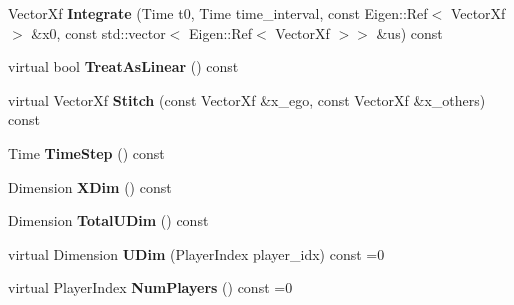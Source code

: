 \begin{DoxyCompactItemize}
\item 
Vector\+Xf {\bfseries Integrate} (Time t0, Time time\+\_\+interval, const Eigen\+::\+Ref$<$ Vector\+Xf $>$ \&x0, const std\+::vector$<$ Eigen\+::\+Ref$<$ Vector\+Xf $>$$>$ \&us) const \hypertarget{classilqgames_1_1_multi_player_integrable_system_afa891d5a1184cefdc316f76528d01a0e}{}\label{classilqgames_1_1_multi_player_integrable_system_afa891d5a1184cefdc316f76528d01a0e}

\item 
virtual bool {\bfseries Treat\+As\+Linear} () const \hypertarget{classilqgames_1_1_multi_player_integrable_system_adf8ab89fd04892a1806814ef4ce89188}{}\label{classilqgames_1_1_multi_player_integrable_system_adf8ab89fd04892a1806814ef4ce89188}

\item 
virtual Vector\+Xf {\bfseries Stitch} (const Vector\+Xf \&x\+\_\+ego, const Vector\+Xf \&x\+\_\+others) const \hypertarget{classilqgames_1_1_multi_player_integrable_system_a027ab5dea23c68ea74040a50a7b16c31}{}\label{classilqgames_1_1_multi_player_integrable_system_a027ab5dea23c68ea74040a50a7b16c31}

\item 
Time {\bfseries Time\+Step} () const \hypertarget{classilqgames_1_1_multi_player_integrable_system_a1dfd36e77c611fb9d72ba7d2f66dbc08}{}\label{classilqgames_1_1_multi_player_integrable_system_a1dfd36e77c611fb9d72ba7d2f66dbc08}

\item 
Dimension {\bfseries X\+Dim} () const \hypertarget{classilqgames_1_1_multi_player_integrable_system_a1f3d72304e04f6906e6e1066717411a7}{}\label{classilqgames_1_1_multi_player_integrable_system_a1f3d72304e04f6906e6e1066717411a7}

\item 
Dimension {\bfseries Total\+U\+Dim} () const \hypertarget{classilqgames_1_1_multi_player_integrable_system_ac6fc71106bffdff776a55792af4560d1}{}\label{classilqgames_1_1_multi_player_integrable_system_ac6fc71106bffdff776a55792af4560d1}

\item 
virtual Dimension {\bfseries U\+Dim} (Player\+Index player\+\_\+idx) const =0\hypertarget{classilqgames_1_1_multi_player_integrable_system_a89563d59d8cda88e0825992b86c9a146}{}\label{classilqgames_1_1_multi_player_integrable_system_a89563d59d8cda88e0825992b86c9a146}

\item 
virtual Player\+Index {\bfseries Num\+Players} () const =0\hypertarget{classilqgames_1_1_multi_player_integrable_system_a894daac1bf9f941718529e5a31b81a88}{}\label{classilqgames_1_1_multi_player_integrable_system_a894daac1bf9f941718529e5a31b81a88}


\end{DoxyCompactItemize}
